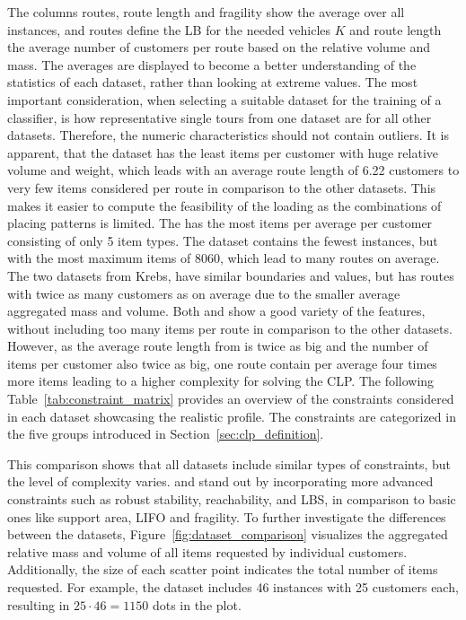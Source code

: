 

The columns routes, route length and fragility show the average over all instances, and
routes define the \gls{LB} for the needed vehicles $K$ and route length the average number of customers per route based
on the relative volume and mass. The averages are displayed to become a better understanding of the
statistics of each dataset, rather than looking at extreme values.
The most important consideration, when selecting a suitable dataset for the training of a classifier,
is how representative single tours from one dataset are for all other datasets. Therefore, the numeric characteristics
should not contain outliers. It is apparent, that the \gendreauDataSetText dataset has the least items per customer
with huge relative volume and weight, which leads with an average route length of 6.22 customers to very few items
considered per route in comparison to the other datasets. This makes it easier to compute the feasibility of the loading
as the combinations of placing patterns is limited. The \mouraDataSetText has the most items per average per customer consisting
of only 5 item types. The \ceschiaDataSetText dataset contains the fewest instances, but with the most maximum items of 8060,
which lead to many routes on average. The two datasets from Krebs, have similar
boundaries and values, but \krebsBDataSetText has routes with twice as many customers as \krebsADataSetText on average due
to the smaller average aggregated mass and volume. Both \krebsADataSetText and \gendreauDataSetText
show a good variety of the features, without including too many items per route in comparison to the other datasets.
However, as the average route length from \krebsADataSetText is twice as big and the number of items per customer also
twice as big, one route contain per average four times more items leading to a higher complexity for solving the \gls{CLP}.
The following Table~\ref{tab:constraint_matrix} provides an overview of the constraints considered
in each dataset showcasing the realistic profile. The constraints are categorized in the five groups introduced
in Section~\ref{sec:clp_definition}.
\clearpage


This comparison shows that all datasets include similar types of constraints, but the level
of complexity varies. \krebsADataSetText and \ceschiaDataSetText stand out by incorporating
more advanced constraints such as robust stability, reachability, and \gls{LBS}, in comparison to
basic ones like support area, \gls{LIFO} and fragility. To further investigate the differences
between the datasets, Figure~\ref{fig:dataset_comparison} visualizes the aggregated relative mass and
volume of all items requested by individual customers.
Additionally, the size of each scatter point indicates the total number of items requested.
For example, the \mouraDataSetText dataset includes 46
instances with 25 customers each, resulting in $25 \cdot 46 = 1150$ dots in the plot.

